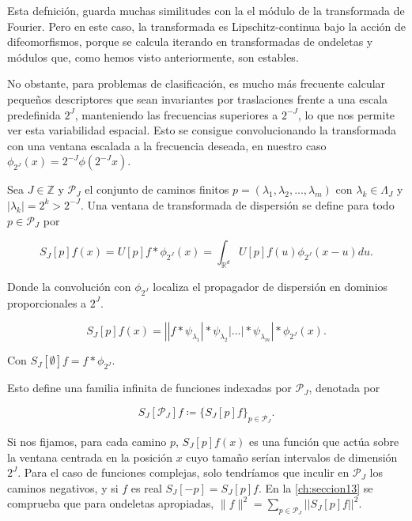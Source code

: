 \noindent Esta defnición, guarda muchas similitudes con la el módulo de la transformada de Fourier. Pero en este caso, la transformada es Lipschitz-continua bajo la acción de difeomorfismos, porque se calcula iterando en transformadas de ondeletas y módulos que, como hemos visto anteriormente, son estables. 

\medskip

\noindent No obstante, para problemas de clasificación, es mucho más frecuente calcular pequeños descriptores que sean invariantes por traslaciones frente a una escala predefinida $2^J$, manteniendo las frecuencias superiores a $2^{-J}$, lo que nos permite ver esta variabilidad espacial. Esto se consigue convolucionando la transformada con una ventana escalada a la frecuencia deseada, en nuestro caso $\phi_{2^J}(x)=2^{-J}\phi(2^{-J}x)$. 

\begin{definicion}
Sea $J \in \mathbb{Z}$ y $\mathcal{P}_J$ el conjunto de caminos finitos $p=(\lambda_1,\lambda_2,...,\lambda_m)$ con $\lambda_k \in \Lambda_J$ y $|\lambda_k|=2^{k}>2^{-J}$. Una ventana de transformada de dispersión se define para todo $p \in \mathcal{P}_J$ por

\begin{equation}
  S_J[p]f(x)=U[p]f \ast \phi_{2^J}(x)=\int_{\mathbb{R}^d}U[p]f(u)\phi_{2^J}(x-u)du.
\end{equation}

\noindent Donde la convolución con $\phi_{2^J}$ localiza el propagador de dispersión en dominios proporcionales a $2^J$.

\begin{equation}
  S_J[p]f(x)=\left| |f \ast \psi_{\lambda_1} | \ast \psi_{\lambda_2} | \ldots | \ast \psi_{\lambda_m} \right| \ast \phi_{2^J}(x).
\end{equation}

Con $S_J[\emptyset] f= f \ast \phi_{2^J}$.
\end{definicion}


\noindent Esto define una familia infinita de funciones indexadas por $\mathcal{P}_J$, denotada por

$$S_J[\mathcal{P}_J]f \coloneqq \lbrace S_J[p]f \rbrace_{p\in\mathcal{P}_J}.$$

\medskip

\noindent Si nos fijamos, para cada camino $p$, $S_J[p]f(x)$ es una función que actúa sobre la ventana centrada en la posición $x$ cuyo tamaño serían intervalos de dimensión $2^J$. Para el caso de funciones complejas, solo tendríamos que inculir en $\mathcal{P}_J$ los caminos negativos, y si $f$ es real $S_J[-p]=S_J[p]f$.
\noindent En la \autoref{ch:seccion13} se comprueba que para ondeletas apropiadas, $\|f\|^2=\sum_{p\in\mathcal{P}_J}\left|\left|S_J[p]f\right|\right|^2$. 

